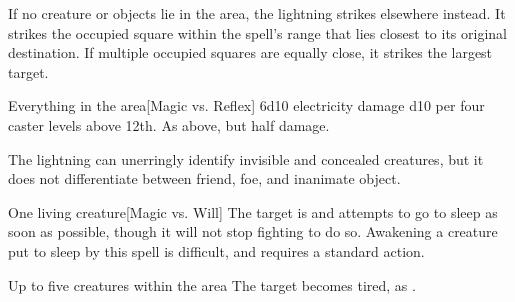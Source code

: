 \begin{spellheader}
    \spellrng{\rngext}
    \spellspecial If no creature or objects lie in the area, the lightning strikes elsewhere instead. It strikes the  occupied square within the spell's range that lies closest to its original destination. If multiple occupied squares are equally close, it strikes the largest target.
\end{spellheader}
\begin{spelleffects}
    \begin{spelltargets}{Everything in the area}[Magic vs. Reflex]
        \spellsuccess 6d10 electricity damage \add d10 per four caster levels above 12th.
        \spellfailure As above, but half damage.
    \end{spelltargets}
\end{spelleffects}
\begin{spellfooter}
    \spellnotes The lightning can unerringly identify invisible and concealed creatures, but it does not differentiate between friend, foe, and inanimate object.
\end{spellfooter}

\begin{spellheader}
    \spellrng{\rngmed}
    \spelldur{\durshort}
\end{spellheader}
\begin{spelleffects}
    \begin{spelltarget}{One living creature}[Magic vs. Will]
        \spellsuccess The target is \fatigued and attempts to go to sleep as soon as possible, though it will not stop fighting to do so. Awakening a creature put to sleep by this spell is difficult, and requires a standard action.
    \end{spelltarget}
\end{spelleffects}
\begin{spellfooter}
    
\end{spellfooter}

\begin{spellheader}
    \spelldur{\durshort}
\end{spellheader}
\begin{spelleffects}
    \begin{spelltargets}{Up to five creatures within the area}
        \spellsuccess The target becomes tired, as .
    \end{spelltargets}
\end{spelleffects}
\begin{spellfooter}
    
\end{spellfooter}

